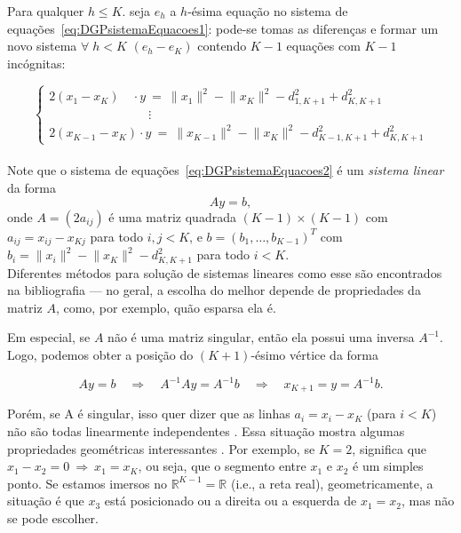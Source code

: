 \documentclass[a4paper,12pt]{article}
\begin{document}
Para qualquer $h\leq K$. seja $e_h$ a $h$-ésima equação no sistema de equações~\ref{eq:DGPsistemaEquacoes1}: pode-se tomas as diferenças e formar um novo sistema $\forall\; h<K$ $(e_h-e_K)$ contendo $K-1$ equações com $K-1$ incógnitas:

\begin{equation}
\begin{cases} 
2(x_1-x_K) \quad\cdot y \ = \ \lVert x_1\rVert^2 - \lVert x_K\rVert^2 - d^2_{1,K+1} + d^2_{K,K+1} 
\\
\qquad\qquad\qquad\qquad\!\!\!\vdots
\\
2(x_{K-1}-x_K) \cdot y \ = \ \lVert x_{K-1}\rVert^2 - \lVert x_K\rVert^2 - d^2_{K-1,K+1} + d^2_{K,K+1} 
\end{cases}
\label{eq:DGPsistemaEquacoes2}
\end{equation}
\\

Note que o sistema de equações~\ref{eq:DGPsistemaEquacoes2} é um \textit{sistema linear} da forma 
\begin{equation}
	Ay=b,
	\label{eq:DGPLinearSystem}
\end{equation}
onde $A = (2a_{ij})$ é uma matriz quadrada $(K-1) \times (K-1)$ com $a_{ij} = x_{ij} - x_{Kj}$ para todo $i,j < K$, e $b = (b_1, \dots, b_{K-1})^T$ com $b_i = \lVert x_i\rVert^2 - \lVert x_K\rVert^2 - d^2_{K,K+1}$ para todo $i<K$. 
\\

Diferentes métodos para solução de sistemas lineares como esse são encontrados na bibliografia \cite{AlgebraLinearElon, libertiEDG} --- no geral, a escolha do melhor depende de propriedades da matriz $A$, como, por exemplo, quão esparsa ela é. 

Em especial, se $A$ não é uma matriz singular, então ela possui uma inversa $A^{-1}$. Logo, podemos obter a posição do $(K+1)$-ésimo vértice da forma

\begin{equation}
	Ay = b \quad \Rightarrow \quad A^{-1}Ay = A^{-1}b \quad \Rightarrow \quad x_{K+1} = y = A^{-1}b.
\end{equation}

Porém, se A é singular, isso quer dizer que as linhas $a_i = x_i - x_K$ (para $i<K$) não são todas linearmente independentes \cite{AlgebraLinearElon}. Essa situação mostra algumas propriedades geométricas interessantes \cite{libertiEDG}. Por exemplo, se $K=2$, significa que $x_1 - x_2 = 0 \ \Rightarrow \  x_1 = x_K$, ou seja, que o segmento entre $x_1$ e $x_2$ é um simples ponto. Se estamos imersos no $\mathbb{R}^{K-1} = \mathbb{R}$ (i.e., a reta real), geometricamente, a situação é que $x_3$ está posicionado ou a direita ou a esquerda de $x_1 = x_2$, mas não se pode escolher.
\end{document}
